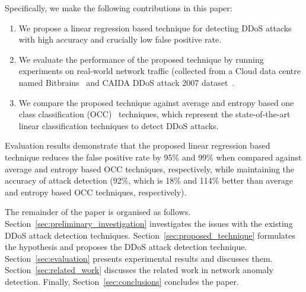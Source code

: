 Specifically, we make the following contributions in this paper:
\begin{enumerate}[{(1)}]
\item We propose a linear regression based technique for detecting DDoS attacks with high accuracy and crucially low false positive rate. 
\item We evaluate the performance of the proposed technique by running experiments on real-world network traffic (collected from a Cloud data centre named Bitbrains~\cite{bitbrains} and CAIDA DDoS attack 2007 dataset~\cite{caida}. 
\item We compare the proposed technique against average and entropy based one class classification (OCC)~\cite{OCC:2008} techniques, which represent the state-of-the-art linear classification techniques to detect DDoS attacks. 
\end{enumerate}

Evaluation results demonstrate that the proposed linear regression based technique reduces the false positive rate by 95\% and 99\% when compared against average and entropy based OCC techniques, respectively, while maintaining the accuracy of attack detection (92\%, which is 18\% and 114\% better than average and entropy based OCC techniques, respectively). 

The remainder of the paper is organised as follows. Section~\ref{sec:preliminary_investigation} investigates the issues with the existing DDoS attack detection techniques. 
Section~\ref{sec:proposed_technique} formulates the hypothesis and proposes the DDoS attack detection technique. 
Section~\ref{sec:evaluation} presents experimental results and discusses them. 
Section~\ref{sec:related_work} discusses the related work in network anomaly detection.
Finally, Section~\ref{sec:conclusions} concludes the paper. 
